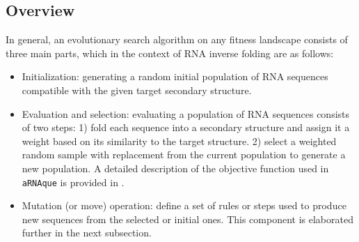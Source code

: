 \subsection*{Overview}
In general, an evolutionary search algorithm on any fitness landscape consists of three main parts, which in the context of RNA inverse folding are as follows: %
\begin{itemize}
	\item Initialization: generating a random initial population of RNA sequences compatible with the given target secondary structure.
	\item Evaluation and selection: evaluating a population of RNA sequences consists of two steps: 1) fold each sequence into a secondary structure and assign it a weight based on its similarity to the target structure. 2) select a weighted random sample with replacement from the current population to generate a new population. A detailed description of the objective function used in \texttt{aRNAque} is provided in \cite{merleau2021simple}. 
	\item Mutation (or move) operation: define a set of rules or steps used to produce new sequences from the selected or initial ones. This component is elaborated further in the next subsection.
	
\end{itemize}


